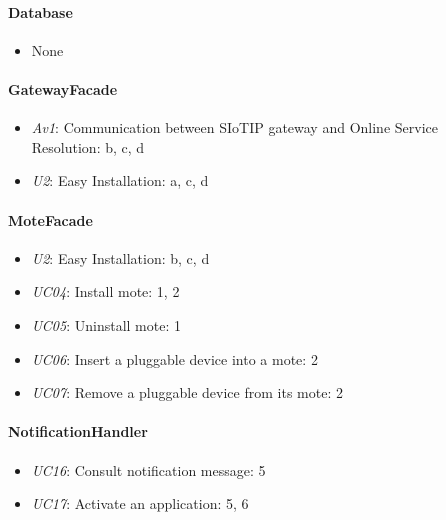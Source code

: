    \paragraph{Database}
        \begin{itemize}
          	\item None
        \end{itemize}

    \paragraph{GatewayFacade}
        \begin{itemize}
            \item \emph{Av1}: Communication between SIoTIP gateway and Online Service \\
                               Resolution: b, c, d
            \item \emph{U2}: Easy Installation: a, c, d
        \end{itemize}

    \paragraph{MoteFacade}
        \begin{itemize}
            \item \emph{U2}: Easy Installation: b, c, d
            \item \emph{UC04}: Install mote: 1, 2
            \item \emph{UC05}: Uninstall mote: 1
            \item \emph{UC06}: Insert a pluggable device into a mote: 2
            \item \emph{UC07}: Remove a pluggable device from its mote: 2
        \end{itemize}

    \paragraph{NotificationHandler}
        \begin{itemize}
            \item \emph{UC16}: Consult notification message: 5
            \item \emph{UC17}: Activate an application: 5, 6
        \end{itemize}

